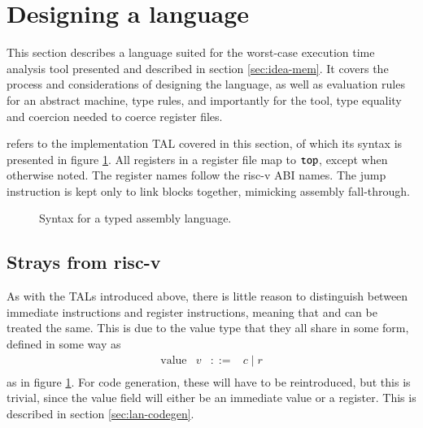 \section{Designing a language}\label{sec:lan}
This section describes a language suited for the worst-case execution time
analysis tool presented and described in section \ref{sec:idea-mem}.
It covers the process and considerations of designing the language, as well as
evaluation rules for an abstract machine, type rules, and importantly for the
tool, type equality and coercion needed to coerce register files.

 refers to the implementation TAL covered in this section, of
which its syntax is presented in figure \ref{syn:my-tal}.
All registers in a register file map to $\texttt{top}$, except when otherwise noted.
The register names follow the risc-v ABI names\cite{cod}.
The jump instruction \jump is kept only to link blocks together, mimicking
assembly fall-through.


\begin{figure}
    
    \caption{Syntax for a typed assembly language.}
    \label{syn:my-tal}
\end{figure}

\subsection{Strays from risc-v}
As with the TALs introduced above, there is little reason to distinguish
between immediate instructions and register instructions, meaning that \subi
and \sub can be treated the same. This is due to the value type that they all
share in some form, defined in some way as
\begin{equation*}
    \begin{array}{llcl}
        \text{value}      & v     & ::= & c \mid r \\
    \end{array}
\end{equation*}
as in figure \ref{syn:my-tal}.
For code generation, these will have to be reintroduced, but this is trivial,
since the value field will either be an immediate value or a register.
This is described in section \ref{sec:lan-codegen}.

